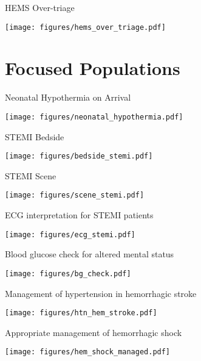 \documentclass[ignorenonframetext,]{beamer}
\makeatletter
\def\maxwidth{\ifdim\Gin@nat@width>\linewidth\linewidth\else\Gin@nat@width\fi}
\def\maxheight{\ifdim\Gin@nat@height>\textheight0.8\textheight\else\Gin@nat@height\fi}
\renewcommand{\includegraphics}[2][]{%
    \Oldincludegraphics[#1,width=\maxwidth,height=\maxheight,keepaspectratio]{#2}}
\makeatother
\begin{document}
\begin{frame}{HEMS Over-triage}

\texttt{[image: figures/hems\_over\_triage.pdf]}

\end{frame}

\section{Focused Populations}\label{focused-populations}

\begin{frame}{Neonatal Hypothermia on Arrival}

\texttt{[image: figures/neonatal\_hypothermia.pdf]}

\end{frame}

\begin{frame}{STEMI Bedside}

\texttt{[image: figures/bedside\_stemi.pdf]}

\end{frame}

\begin{frame}{STEMI Scene}

\texttt{[image: figures/scene\_stemi.pdf]}

\end{frame}

\begin{frame}{ECG interpretation for STEMI patients}

\texttt{[image: figures/ecg\_stemi.pdf]}

\end{frame}

\begin{frame}{Blood glucose check for altered mental status}

\texttt{[image: figures/bg\_check.pdf]}

\end{frame}

\begin{frame}{Management of hypertension in hemorrhagic stroke}

\texttt{[image: figures/htn\_hem\_stroke.pdf]}

\end{frame}

\begin{frame}{Appropriate management of hemorrhagic shock}

\texttt{[image: figures/hem\_shock\_managed.pdf]}

\end{frame}
\end{document}
